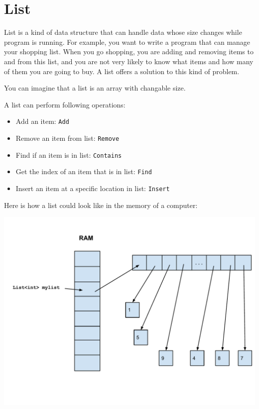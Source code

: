 \documentclass[../main.tex]{subfiles}
\begin{document}
    \section{List}
    List is a kind of data structure that can handle data whose size changes
    while program is running. For example, you want to write a program that can
    manage your shopping list. When you go shopping, you are adding and removing
    items to and from this list, and you are not very likely to know what items
    and how many of them you are going to buy. A list offers a solution to this
    kind of problem.

    You can imagine that a list is an array with changable size.

    A list can perform following operations:
    \begin{itemize}
        \item Add an item: \texttt{Add}
        \item Remove an item from list: \texttt{Remove}
        \item Find if an item is in list: \texttt{Contains}
        \item Get the index of an item that is in list: \texttt{Find}
        \item Insert an item at a specific location in list: \texttt{Insert}
    \end{itemize}

    Here is how a list could look like in the memory of a computer:
    
    \includegraphics[scale = 0.5]{data/img/mmap-list.pdf}
\end{document}
